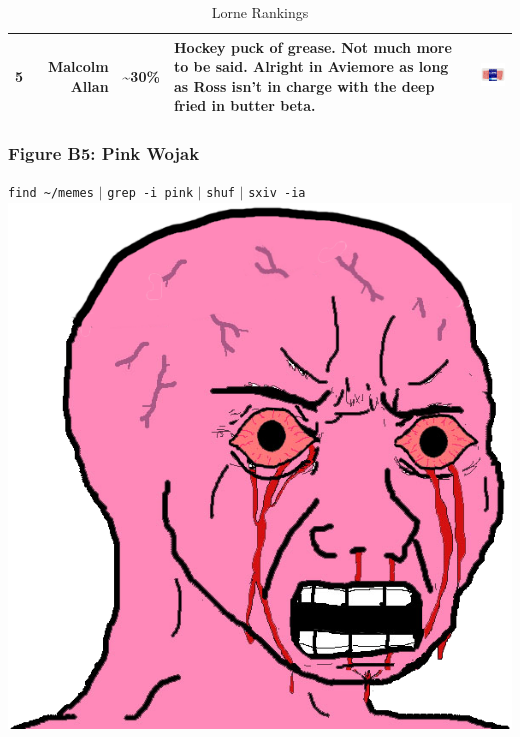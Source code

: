 \documentclass[11pt, english]{article}
\begin{document}
\begin{table}[h]
\begin{center}
\begin{tabular}{rr|p{1.25cm}p{3.5cm}p{2.5cm}}
			5 & Malcolm Allan & \textasciitilde30\% & Hockey puck of grease. Not much more to be said. Alright in Aviemore as long as Ross isn't in charge with the deep fried in butter beta. & \vspace{-0.25cm}\includegraphics[width=2.5cm]{../System/Photos/ma_lorne.jpg}\\
			\hline
		\end{tabular}
			\caption{Lorne Rankings}
		\end{center}
		\end{table}

\newpage

		\subsubsection*{Figure B5: Pink Wojak}
	
	\begin{center}	
		\verb|find ~/memes| $\mathtt{\vert}$ \verb|grep -i pink| $\mathtt{\vert}$ \verb|shuf| $\mathtt{\vert}$ \verb|sxiv -ia|\\[2cm]
		\includegraphics[width=14cm,height=14cm]{../System/Photos/pink.png}
	\end{center}
\end{document}
